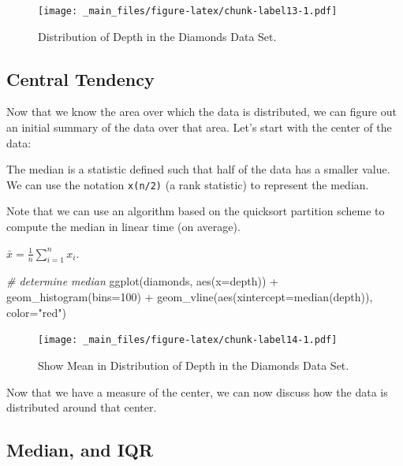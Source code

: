 \documentclass[
]{book}
\newenvironment{Shaded}{\begin{snugshade}}{\end{snugshade}}
\newcommand{\AttributeTok}[1]{\textcolor[rgb]{0.77,0.63,0.00}{#1}}
\newcommand{\CommentTok}[1]{\textcolor[rgb]{0.56,0.35,0.01}{\textit{#1}}}
\newcommand{\DecValTok}[1]{\textcolor[rgb]{0.00,0.00,0.81}{#1}}
\newcommand{\FunctionTok}[1]{\textcolor[rgb]{0.00,0.00,0.00}{#1}}
\newcommand{\NormalTok}[1]{#1}
\newcommand{\SpecialCharTok}[1]{\textcolor[rgb]{0.00,0.00,0.00}{#1}}
\newcommand{\StringTok}[1]{\textcolor[rgb]{0.31,0.60,0.02}{#1}}
\begin{document}
\begin{figure}
\centering
\texttt{[image: \_main\_files/figure-latex/chunk-label13-1.pdf]}
\caption{\label{fig:chunk-label13}Distribution of Depth in the Diamonds Data Set.}
\end{figure}

\hypertarget{central-tendency}{%
\subsection{Central Tendency}\label{central-tendency}}

Now that we know the area over which the data is distributed, we can figure out an initial summary of the data over that area. Let's start with the center of the data:

The median is a statistic defined such that half of the data has a smaller value. We can use the notation \texttt{x(n/2)} (a rank statistic) to represent the median.

Note that we can use an algorithm based on the quicksort partition scheme to compute the median in linear time (on average).

\(\bar{x} = \frac{1}{n}\sum_{i=1}^{n} x_{i}\).

\begin{Shaded}
\begin{Highlighting}[]
\CommentTok{\# determine median}
\FunctionTok{ggplot}\NormalTok{(diamonds, }\FunctionTok{aes}\NormalTok{(}\AttributeTok{x=}\NormalTok{depth)) }\SpecialCharTok{+} \FunctionTok{geom\_histogram}\NormalTok{(}\AttributeTok{bins=}\DecValTok{100}\NormalTok{) }\SpecialCharTok{+} \FunctionTok{geom\_vline}\NormalTok{(}\FunctionTok{aes}\NormalTok{(}\AttributeTok{xintercept=}\FunctionTok{median}\NormalTok{(depth)), }\AttributeTok{color=}\StringTok{"red"}\NormalTok{)}
\end{Highlighting}
\end{Shaded}

\begin{figure}
\centering
\texttt{[image: \_main\_files/figure-latex/chunk-label14-1.pdf]}
\caption{\label{fig:chunk-label14}Show Mean in Distribution of Depth in the Diamonds Data Set.}
\end{figure}

Now that we have a measure of the center, we can now discuss how the data is distributed around that center.

\hypertarget{median-and-iqr}{%
\subsection{Median, and IQR}\label{median-and-iqr}}
\end{document}
